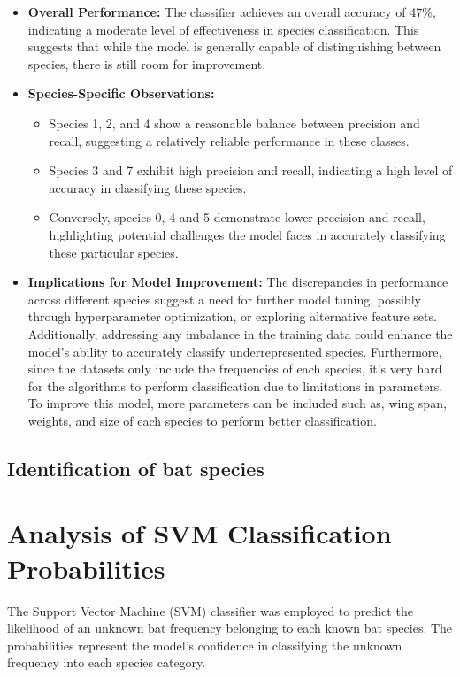 \documentclass[12pt]{article}
\begin{document}
\begin{itemize}
    \item \textbf{Overall Performance:} The classifier achieves an overall accuracy of 47\%, indicating a moderate level of effectiveness in species classification. This suggests that while the model is generally capable of distinguishing between species, there is still room for improvement.

    \item \textbf{Species-Specific Observations:}
    \begin{itemize}
        \item Species 1, 2, and 4 show a reasonable balance between precision and recall, suggesting a relatively reliable performance in these classes.
        \item Species 3 and 7 exhibit high precision and recall, indicating a high level of accuracy in classifying these species.
        \item Conversely, species 0, 4 and 5 demonstrate lower precision and recall, highlighting potential challenges the model faces in accurately classifying these particular species.
    \end{itemize}
    \item \textbf{Implications for Model Improvement:} The discrepancies in performance across different species suggest a need for further model tuning, possibly through hyperparameter optimization, or exploring alternative feature sets. Additionally, addressing any imbalance in the training data could enhance the model's ability to accurately classify underrepresented species. Furthermore, since the datasets only include the frequencies of each species, it's very hard for the algorithms to perform classification due to limitations in parameters. To improve this model, more parameters can be included such as, wing span, weights, and size of each species to perform better classification.
\end{itemize}


\subsection*{Identification of bat species}
\section{Analysis of SVM Classification Probabilities}

The Support Vector Machine (SVM) classifier was employed to predict the likelihood of an unknown bat frequency belonging to each known bat species. The probabilities represent the model's confidence in classifying the unknown frequency into each species category.
\end{document}
